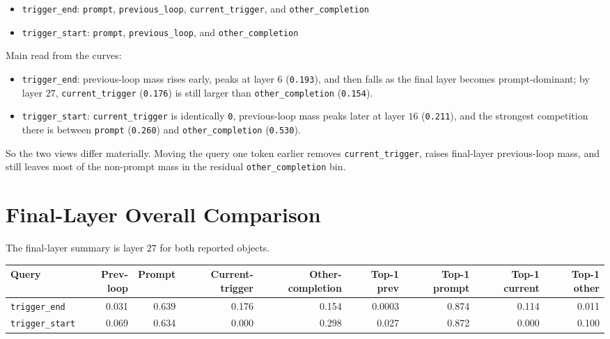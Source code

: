 \documentclass[11pt]{article}
\begin{document}
\begin{itemize}
  \item \texttt{trigger\_end}: \texttt{prompt}, \texttt{previous\_loop}, \texttt{current\_trigger}, and \texttt{other\_completion}
  \item \texttt{trigger\_start}: \texttt{prompt}, \texttt{previous\_loop}, and \texttt{other\_completion}
\end{itemize}

Main read from the curves:

\begin{itemize}
  \item \texttt{trigger\_end}: previous-loop mass rises early, peaks at layer $6$ (\texttt{0.193}), and then falls as the final layer becomes prompt-dominant; by layer $27$, \texttt{current\_trigger} (\texttt{0.176}) is still larger than \texttt{other\_completion} (\texttt{0.154}).
  \item \texttt{trigger\_start}: \texttt{current\_trigger} is identically \texttt{0}, previous-loop mass peaks later at layer $16$ (\texttt{0.211}), and the strongest competition there is between \texttt{prompt} (\texttt{0.260}) and \texttt{other\_completion} (\texttt{0.530}).
\end{itemize}

So the two views differ materially. Moving the query one token earlier removes \texttt{current\_trigger}, raises final-layer previous-loop mass, and still leaves most of the non-prompt mass in the residual \texttt{other\_completion} bin.

\section*{Final-Layer Overall Comparison}

The final-layer summary is layer $27$ for both reported objects.

\begin{center}
\scriptsize
\begin{tabular}{lrrrrrrrr}
\toprule
Query & Prev-loop & Prompt & Current-trigger & Other-completion & Top-1 prev & Top-1 prompt & Top-1 current & Top-1 other \\
\midrule
\texttt{trigger\_end} & 0.031 & 0.639 & 0.176 & 0.154 & 0.0003 & 0.874 & 0.114 & 0.011 \\
\texttt{trigger\_start} & 0.069 & 0.634 & 0.000 & 0.298 & 0.027 & 0.872 & 0.000 & 0.100 \\
\bottomrule
\end{tabular}
\normalsize
\end{center}
\end{document}
